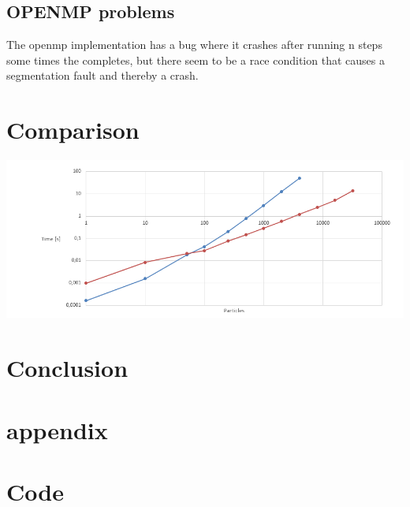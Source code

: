 \documentclass[a4paper,10pt,titlepage]{report}
\begin{document}
\subsection{OPENMP problems}
The openmp implementation has a bug where it crashes after running n steps some times the completes, but there seem to be a race condition that causes a segmentation fault and thereby a crash.

\section{Comparison}

\includegraphics[scale=0.3]{oldvsnew}

\section{Conclusion}
\newpage
\section{appendix}

\section{Code}

%

%
\end{document}
